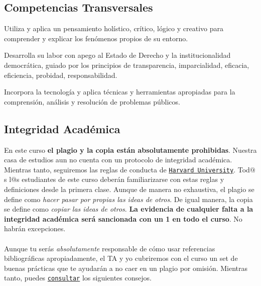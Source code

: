 \documentclass[letterpaper]{article}
\renewenvironment{itemize}{
  \begin{list}{}{
    \setlength{\leftmargin}{1.5em}
  }
}{
  \end{list}
}
\begin{document}
\subsection*{Competencias Transversales}


\begin{itemize}
	\item[$\bullet$] Utiliza y aplica un pensamiento hol\'istico, cr\'itico, l\'ogico y creativo para comprender y explicar los fen\'omenos propios de su entorno.
	\item[$\bullet$] Desarrolla su labor con apego al Estado de Derecho y la institucionalidad democr\'atica, guiado por los principios de transparencia, imparcialidad, eficacia, eficiencia, probidad, responsabilidad. 
	\item[$\bullet$] Incorpora la tecnolog\'ia y aplica t\'ecnicas y herramientas apropiadas para la comprensi\'on, an\'alisis y resoluci\'on de problemas p\'ublicos.
\end{itemize}


\subsection*{Integridad Acad\'emica}

En este curso {\bf el plagio y la copia est\'an absolutamente prohibidas}. Nuestra casa de estudios aun no cuenta con un protocolo de integridad acad\'emica. Mientras tanto, seguiremos las reglas de conducta de  \href{www.extension.harvard.edu/resources-policies/student-conduct/academic-integrity}{\texttt{Harvard University}}. Tod$@$s l$@$s estudiantes de este curso deber\'an familiarizarse con estas reglas y definiciones desde la primera clase. Aunque de manera no exhaustiva, el plagio se define como \emph{hacer pasar por propias las ideas de otros}. De igual manera, la copia se define como \emph{copiar las ideas de otros}. {\bf La evidencia de cualquier falta a la integridad acad\'emica ser\'a sancionada con un 1 en todo el curso}. No habr\'an excepciones. 
\\
\\
Aunque tu ser\'as \emph{absolutamente} responsable de c\'omo usar referencias bibliogr\'aficas apropiadamente, el TA y yo cubriremos con el curso un set de buenas pr\'acticas que te ayudar\'an a no caer en un plagio por omisi\'on. Mientras tanto, puedes \href{https://www.extension.harvard.edu/resources-policies/resources/avoiding-plagiarism}{\texttt{consultar}} los siguientes consejos.
\end{document}
